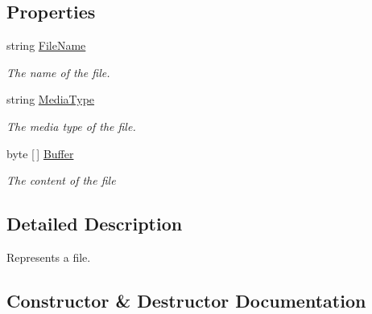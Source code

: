 \subsection*{Properties}
\begin{DoxyCompactItemize}
\item 
string \hyperlink{classCqrs_1_1WebApi_1_1Formatters_1_1FormMultipart_1_1Infrastructure_1_1HttpFile_a2cc7c6095e350040250f4f7160b05441_a2cc7c6095e350040250f4f7160b05441}{File\+Name}
\begin{DoxyCompactList}\small\item\em The name of the file. \end{DoxyCompactList}\item 
string \hyperlink{classCqrs_1_1WebApi_1_1Formatters_1_1FormMultipart_1_1Infrastructure_1_1HttpFile_a46f04eac1b1e5c8882622548912c481b_a46f04eac1b1e5c8882622548912c481b}{Media\+Type}
\begin{DoxyCompactList}\small\item\em The media type of the file. \end{DoxyCompactList}\item 
byte \mbox{[}$\,$\mbox{]} \hyperlink{classCqrs_1_1WebApi_1_1Formatters_1_1FormMultipart_1_1Infrastructure_1_1HttpFile_a225694e4e77da8307f6c22d9cb33fbb0_a225694e4e77da8307f6c22d9cb33fbb0}{Buffer}
\begin{DoxyCompactList}\small\item\em The content of the file \end{DoxyCompactList}\end{DoxyCompactItemize}


\subsection{Detailed Description}
Represents a file. 



\subsection{Constructor \& Destructor Documentation}
\mbox{\label{classCqrs_1_1WebApi_1_1Formatters_1_1FormMultipart_1_1Infrastructure_1_1HttpFile_a27c8a6f375de51c5d5ff6d3602ab23c2_a27c8a6f375de51c5d5ff6d3602ab23c2}} 
